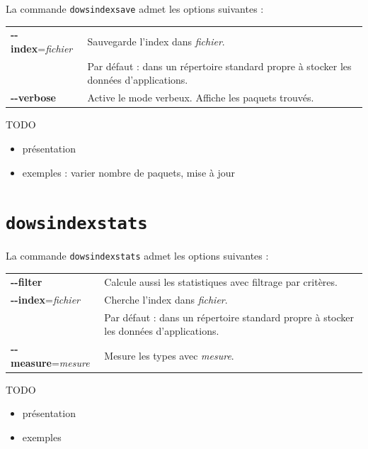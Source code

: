 \documentclass[a4paper]{report}
\theoremstyle{definition}
\newcommand{\dowsindex}{\texttt{dowsindex}\xspace}
\begin{document}
La commande \dowsindex \texttt{save} admet les options suivantes :

\begin{table}[h]
\begin{tabular}{ll}
		\textbf{-{}-index}=\textit{fichier} &
		Sauvegarde l'index dans \textit{fichier}. \\ &
		Par défaut : dans un répertoire standard propre à stocker les données d'applications.
	\\
		\textbf{-{}-verbose} &
		Active le mode verbeux. Affiche les paquets trouvés.
\end{tabular}
\end{table}

TODO
\begin{itemize}
	\item présentation
	\item exemples : varier nombre de paquets, mise à jour
\end{itemize}


\section{\dowsindex \texttt{stats}}

La commande \dowsindex \texttt{stats} admet les options suivantes :

\begin{table}[h]
\begin{tabular}{ll}
		\textbf{-{}-filter} &
		Calcule aussi les statistiques avec filtrage par critères.
	\\
		\textbf{-{}-index}=\textit{fichier} &
		Cherche l'index dans \textit{fichier}. \\ &
		Par défaut : dans un répertoire standard propre à stocker les données d'applications.
	\\
		\textbf{-{}-measure}=\textit{mesure} &
		Mesure les types avec \textit{mesure}.
\end{tabular}
\end{table}

TODO
\begin{itemize}
	\item présentation
	\item exemples
\end{itemize}

\end{document}
